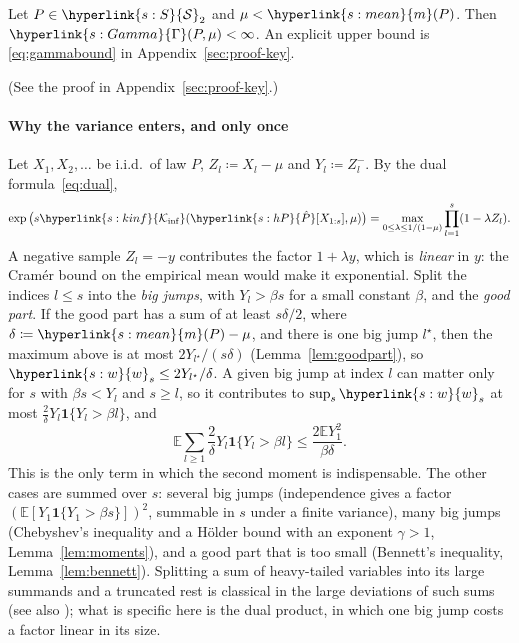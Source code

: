 \documentclass[11pt]{article}
\newcommand{\E}{\mathbb{E}}
\newcommand{\ind}{\mathbf{1}}
\newcommand{\sy}[2]{{\hyperlink{#1}{#2}}}
\newcommand{\Sm}{\sy{s:S}{\mathcal{S}}}
\newcommand{\mean}{\sy{s:mean}{m}}
\newcommand{\Kinf}{\sy{s:kinf}{\mathcal{K}_{\inf}}}
\newcommand{\hP}{\sy{s:hP}{\hat{P}}}
\newcommand{\ws}{\sy{s:w}{w}}
\newcommand{\Gam}{\sy{s:Gamma}{\Gamma}}
\begin{document}
\begin{proposition}\label{prop:key}
Let $P\in\Sm_2$ and $\mu<\mean(P)$. Then $\Gam(P,\mu)<\infty$. An explicit upper bound is
\eqref{eq:gammabound} in Appendix~\ref{sec:proof-key}.
\end{proposition}

(See the proof in Appendix~\ref{sec:proof-key}.)

\paragraph{Why the variance enters, and only once} Let $X_1,X_2,\dots$ be i.i.d.\ of law $P$,
$Z_l\coloneqq X_l-\mu$ and $Y_l\coloneqq Z_l^-$. By the dual formula~\eqref{eq:dual},
\begin{equation*}
  \exp\big(s\Kinf(\hP[X_{1:s}],\mu)\big)=\max_{0\le\lambda\le1/(1-\mu)}\prod_{l=1}^s(1-\lambda Z_l).
\end{equation*}
A negative sample $Z_l=-y$ contributes the factor $1+\lambda y$, which is \emph{linear} in $y$:
the Cram\'er bound on the empirical mean would make it exponential. Split the indices $l\le s$ into
the \emph{big jumps}, with $Y_l>\beta s$ for a small constant $\beta$, and the \emph{good part}.
If the good part has a sum of at least $s\delta/2$, where $\delta\coloneqq \mean(P)-\mu$, and there is one
big jump $l^\star$, then the maximum above is at most $2Y_{l^\star}/(s\delta)$
(Lemma~\ref{lem:goodpart}), so $\ws_s\le2Y_{l^\star}/\delta$. A given big jump at index $l$ can
matter only for $s$ with $\beta s<Y_l$ and $s\ge l$, so it contributes to $\sup_s\ws_s$ at most
$\frac2\delta Y_l\ind\{Y_l>\beta l\}$, and
\begin{equation*}
  \E\sum_{l\ge1}\frac2\delta Y_l\ind\{Y_l>\beta l\}\le\frac{2\E Y_1^2}{\beta\delta}.
\end{equation*}
This is the only term in which the second moment is indispensable. The other cases are summed
over $s$: several big jumps (independence gives a factor $(\E[Y_1\ind\{Y_1>\beta s\}])^2$, summable in
$s$ under a finite variance), many big jumps (Chebyshev's inequality and a H\"older bound with an
exponent $\gamma>1$, Lemma~\ref{lem:moments}), and a good part that is too small (Bennett's
inequality, Lemma~\ref{lem:bennett}). Splitting a sum of heavy-tailed variables into its large
summands and a truncated rest is classical in the large deviations of such sums (see also
\citealp{FN71,Nag79}); what is specific here is the dual product, in which one big jump costs a
factor linear in its size.
\end{document}
